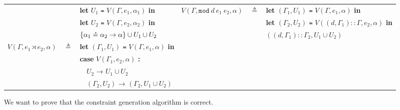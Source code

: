 \documentclass{article}
\theoremstyle{definition}
\newcommand*{\cons}{::}
\newcommand*{\A}[1]{\overset{\,_{\mbox{\Large .}}}{#1}}
\newcommand*{\modid}{d}
\newcommand*{\link}[2]{{#1}\rtimes{#2}}
\newcommand*{\Letm}{\mathtt{mod}}
\begin{document}
\begin{tabular}{rclrcl}
                                     &              & \textbf{let} $U_1$ \texttt{=} $V(\Gamma,e_1,\alpha_1)$ \textbf{in}              & $V(\Gamma,\Letm\:\modid\:e_1\:e_2,\alpha)$ & $\triangleq$ & \textbf{let} $(\Gamma_1,U_1)$ \texttt{=} $V(\Gamma,e_1,\alpha)$ \textbf{in}                       \\
                                     &              & \textbf{let} $U_2$ \texttt{=} $V(\Gamma,e_2,\alpha_2)$ \textbf{in}              &                                            &              & \textbf{let} $(\Gamma_2,U_2)$ \texttt{=} $V((\modid,\Gamma_1)\cons\Gamma,e_2,\alpha)$ \textbf{in} \\
                                     &              & $\{\alpha_1\A{=}\alpha_2\rightarrow\alpha\}\cup U_1\cup U_2$                    &                                            &              & $((\modid,\Gamma_1)\cons\Gamma_2,U_1\cup U_2)$                                                    \\
  $V(\Gamma,\link{e_1}{e_2},\alpha)$ & $\triangleq$ & \textbf{let} $(\Gamma_1,U_1)$ \texttt{=} $V(\Gamma,e_1,\alpha)$ \textbf{in}                                                                                                                                                                     \\
                                     &              & \textbf{case} $V(\Gamma_1,e_2,\alpha)$ \textbf{:}                                                                                                                                                                                               \\
                                     &              & $\quad U_2$ → $U_1\cup U_2$                                                                                                                                                                                                                     \\
                                     &              & $\quad(\Gamma_2,U_2)$ → $(\Gamma_2,U_1\cup U_2)$
\end{tabular}

\vphantom{}

We want to prove that the constraint generation algorithm is correct.
\end{document}
